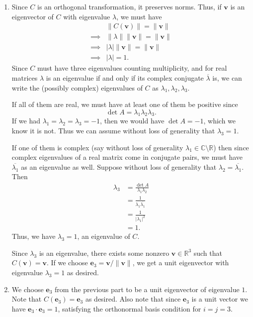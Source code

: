 \documentclass[12 pt, letterpaper]{hmcpset}
\begin{document}
\begin{solution}
	\begin{enumerate}
		\item Since $C$ is an orthogonal transformation, it preserves norms. Thus, if $\mathbf{v}$ is an eigenvector of $C$ with eigenvalue $\lambda$, we must have
			\[
				\begin{split}
					& \lVert C(\mathbf{v}) \rVert = \lVert \mathbf{v} \rVert \\
					\implies & \lVert \lambda \rVert \lVert \mathbf{v} \rVert = \lVert \mathbf{v} \rVert \\
					\implies & \lvert \lambda \rvert \lVert \mathbf{v} \rVert = \lVert \mathbf{v} \rVert \\
					\implies & \lvert \lambda \rvert = 1. 
				\end{split}
			\]
			Since $C$ must have three eigenvalues counting multiplicity, and for real matrices $\lambda$ is an eigenvalue if and only if its complex conjugate $\overline{\lambda}$ is, we can write the (possibly complex) eigenvalues of $C$ as $\lambda_{1}, \lambda_{2}, \lambda_{3}$. 

			If all of them are real, we must have at least one of them be positive since
			\[
				\det A = \lambda_{1} \lambda_{2} \lambda_{3}.
			\]
			If we had $\lambda_{1} = \lambda_{2} = \lambda_{3} = -1$, then we would have $\det A = -1$, which we know it is not. Thus we can assume without loss of generality that $\lambda_{3} = 1$. 

			If one of them is complex (say without loss of generality $\lambda_{1} \in \mathbb{C} \setminus \mathbb{R}$) then since complex eigenvalues of a real matrix come in conjugate pairs, we must have $\overline{\lambda_{1}}$ as an eigenvalue as well. Suppose without loss of generality that $\lambda_{2} = \overline{\lambda_{1}}$. Then
			\[
				\begin{split}
					\lambda_{3} & = \frac{\det A}{\lambda_{1} \lambda_{2}} \\
						    & = \frac{1}{\lambda_{1} \overline{\lambda_{1}}} \\
						    & = \frac{1}{\lvert \lambda_{1} \rvert^{2}} \\
						    & = 1.
				\end{split}
			\]
			Thus, we have $\lambda_{3} = 1$, an eigenvalue of $C$. 

			Since $\lambda_{3}$ is an eigenvalue, there exists some nonzero $\mathbf{v} \in \mathbb{R}^{3}$ such that $C(\mathbf{v}) = \mathbf{v}$. If we choose $\mathbf{e}_{3} = \mathbf{v}/\lVert \mathbf{v} \rVert$, we get a unit eigenvector with eigenvalue $\lambda_{3} = 1$ as desired.
		\item We choose $\mathbf{e}_{3}$ from the previous part to be a unit eigenvector of eigenvalue $1$. Note that $C(\mathbf{e}_{3}) = \mathbf{e}_{3}$ as desired. Also note that since $\mathbf{e}_{3}$ is a unit vector we have $\mathbf{e}_{3} \cdot \mathbf{e}_{3} = 1$, satisfying the orthonormal basis condition for $i = j = 3$. 


\end{enumerate}
\end{solution}
\end{document}
